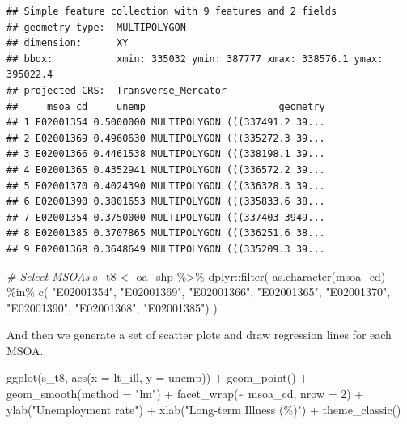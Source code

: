 \documentclass[
]{book}
\newenvironment{Shaded}{\begin{snugshade}}{\end{snugshade}}
\newcommand{\AttributeTok}[1]{\textcolor[rgb]{0.77,0.63,0.00}{#1}}
\newcommand{\CommentTok}[1]{\textcolor[rgb]{0.56,0.35,0.01}{\textit{#1}}}
\newcommand{\DecValTok}[1]{\textcolor[rgb]{0.00,0.00,0.81}{#1}}
\newcommand{\FunctionTok}[1]{\textcolor[rgb]{0.00,0.00,0.00}{#1}}
\newcommand{\NormalTok}[1]{#1}
\newcommand{\OtherTok}[1]{\textcolor[rgb]{0.56,0.35,0.01}{#1}}
\newcommand{\SpecialCharTok}[1]{\textcolor[rgb]{0.00,0.00,0.00}{#1}}
\newcommand{\StringTok}[1]{\textcolor[rgb]{0.31,0.60,0.02}{#1}}
\begin{document}
\begin{verbatim}
## Simple feature collection with 9 features and 2 fields
## geometry type:  MULTIPOLYGON
## dimension:      XY
## bbox:           xmin: 335032 ymin: 387777 xmax: 338576.1 ymax: 395022.4
## projected CRS:  Transverse_Mercator
##     msoa_cd     unemp                       geometry
## 1 E02001354 0.5000000 MULTIPOLYGON (((337491.2 39...
## 2 E02001369 0.4960630 MULTIPOLYGON (((335272.3 39...
## 3 E02001366 0.4461538 MULTIPOLYGON (((338198.1 39...
## 4 E02001365 0.4352941 MULTIPOLYGON (((336572.2 39...
## 5 E02001370 0.4024390 MULTIPOLYGON (((336328.3 39...
## 6 E02001390 0.3801653 MULTIPOLYGON (((335833.6 38...
## 7 E02001354 0.3750000 MULTIPOLYGON (((337403 3949...
## 8 E02001385 0.3707865 MULTIPOLYGON (((336251.6 38...
## 9 E02001368 0.3648649 MULTIPOLYGON (((335209.3 39...
\end{verbatim}

\begin{Shaded}
\begin{Highlighting}[]
\CommentTok{\# Select MSOAs}
\NormalTok{s\_t8 }\OtherTok{\textless{}{-}}\NormalTok{ oa\_shp }\SpecialCharTok{\%\textgreater{}\%}\NormalTok{ dplyr}\SpecialCharTok{::}\FunctionTok{filter}\NormalTok{(}
    \FunctionTok{as.character}\NormalTok{(msoa\_cd) }\SpecialCharTok{\%in\%} \FunctionTok{c}\NormalTok{(}
      \StringTok{"E02001354"}\NormalTok{, }
      \StringTok{"E02001369"}\NormalTok{, }
      \StringTok{"E02001366"}\NormalTok{, }
      \StringTok{"E02001365"}\NormalTok{, }
      \StringTok{"E02001370"}\NormalTok{, }
      \StringTok{"E02001390"}\NormalTok{, }
      \StringTok{"E02001368"}\NormalTok{, }
      \StringTok{"E02001385"}\NormalTok{)}
\NormalTok{    )}
\end{Highlighting}
\end{Shaded}

And then we generate a set of scatter plots and draw regression lines for each MSOA.

\begin{Shaded}
\begin{Highlighting}[]
\FunctionTok{ggplot}\NormalTok{(s\_t8, }\FunctionTok{aes}\NormalTok{(}\AttributeTok{x =}\NormalTok{ lt\_ill, }\AttributeTok{y =}\NormalTok{ unemp)) }\SpecialCharTok{+} 
  \FunctionTok{geom\_point}\NormalTok{() }\SpecialCharTok{+} 
  \FunctionTok{geom\_smooth}\NormalTok{(}\AttributeTok{method =} \StringTok{"lm"}\NormalTok{) }\SpecialCharTok{+}
  \FunctionTok{facet\_wrap}\NormalTok{(}\SpecialCharTok{\textasciitilde{}}\NormalTok{ msoa\_cd, }\AttributeTok{nrow =} \DecValTok{2}\NormalTok{) }\SpecialCharTok{+}
  \FunctionTok{ylab}\NormalTok{(}\StringTok{"Unemployment rate"}\NormalTok{) }\SpecialCharTok{+} 
  \FunctionTok{xlab}\NormalTok{(}\StringTok{"Long{-}term Illness (\%)"}\NormalTok{) }\SpecialCharTok{+}
  \FunctionTok{theme\_classic}\NormalTok{()}
\end{Highlighting}
\end{Shaded}
\end{document}
